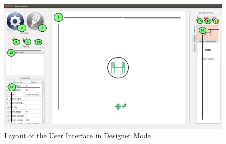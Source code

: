   \begin{figure}[h!]
 	\begin{center}
 	\includegraphics[width=\textwidth]{./images_design/designer_robot_creation_nums.png}
 	\caption{Layout of the User Interface in Designer Mode\label{fig:des_overview}}
 	\end{center}
 \end{figure}
 
